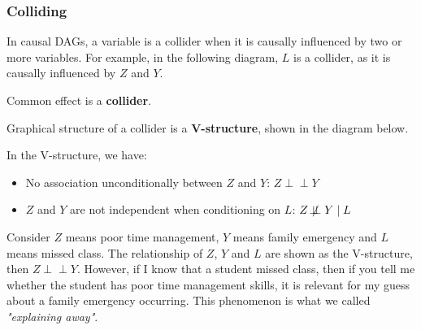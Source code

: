\subsubsection{Colliding}

In causal DAGs, a variable is a collider when it is causally influenced by two or more variables. For example, in the following diagram, $L$ is a collider, as it is causally influenced by $Z$ and $Y$.

\begin{center}
\end{center}

\begin{definition} [collider]
Common effect is a \textbf{collider}.
\end{definition}

\begin{definition}
    Graphical structure of a collider is a \textbf{V-structure}, shown in the diagram below.
\end{definition} 

\begin{center}
\end{center}

In the V-structure, we have:
\begin{itemize}
    \item No association unconditionally between $Z$ and $Y$: $Z \perp\!\!\!\perp Y$
    \item $Z$ and $Y$ are not independent when conditioning on $L$: $Z \not\!\perp\!\!\!\perp Y \mid L$
\end{itemize}

\begin{example}
    Consider $Z$ means poor time management, $Y$ means family emergency and $L$ means missed class. The relationship of $Z$, $Y$ and $L$ are shown as the V-structure, then $Z \perp\!\!\!\perp Y$. However, if I know that a student missed class, then if you tell me whether the student has poor time management skills, it is relevant for my guess about a family emergency occurring.  This phenomenon is what we called  \textit{"explaining away"}.
\end{example}


